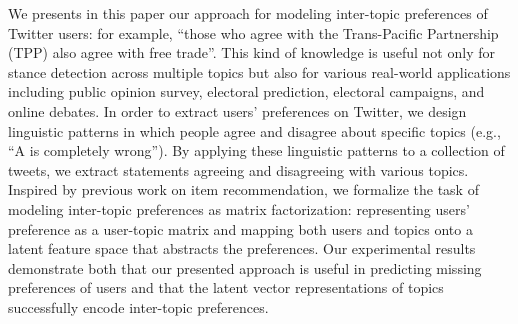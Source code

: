 We presents in this paper our approach for modeling inter-topic preferences of Twitter users: for example, ``those who agree with the Trans-Pacific Partnership (TPP) also agree with free trade''. This kind of knowledge is useful not only for stance detection across multiple topics but also for various real-world applications including public opinion survey, electoral prediction, electoral campaigns, and online debates. In order to extract users' preferences on Twitter, we design linguistic patterns in which people agree and disagree about specific topics (e.g., ``A is completely wrong''). By applying these linguistic patterns to a collection of tweets, we extract statements agreeing and disagreeing with various topics. Inspired by previous work on item recommendation, we formalize the task of modeling inter-topic preferences as matrix factorization: representing users' preference as a user-topic matrix and mapping both users and topics onto a latent feature space that abstracts the preferences. Our experimental results demonstrate both that our presented approach is useful in predicting missing preferences of users and that the latent vector representations of topics successfully encode inter-topic preferences.
